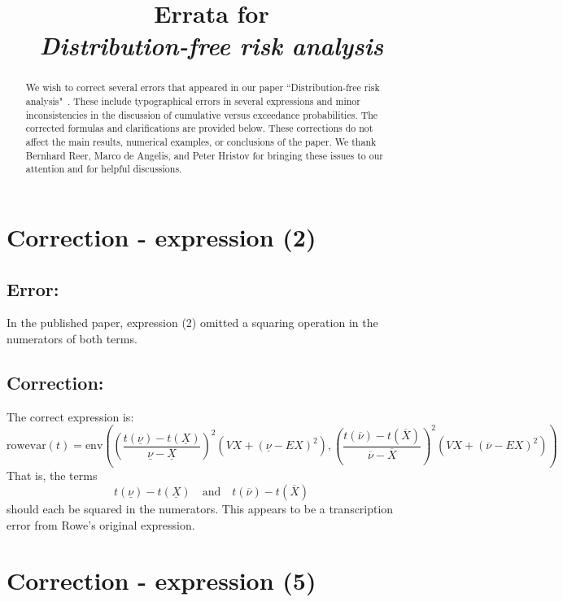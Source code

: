 \documentclass{article}
\title{Errata for \\ \textit{Distribution-free risk analysis}}
\begin{document}
\maketitle

\begin{abstract}
\noindent We wish to correct several errors that appeared in our paper ``Distribution-free risk analysis"~\cite{GRAY2022133}. These include typographical errors in several expressions and minor inconsistencies in the discussion of cumulative versus exceedance probabilities. The corrected formulas and clarifications are provided below. These corrections do not affect the main results, numerical examples, or conclusions of the paper. We thank Bernhard Reer, Marco de Angelis, and Peter Hristov for bringing these issues to our attention and for helpful discussions.
\end{abstract}

\section{Correction - expression (2)}
\subsection*{Error:}
In the published paper, expression (2) omitted a squaring operation in the numerators of both terms.

\subsection*{Correction:}
The correct expression is:
\begin{equation}
\text{rowevar}(t)
=
\text{env}\left(
\left(\frac{t\left(\underline{\nu}\right)-t\left(\underline{X}\right)}
{\underline{\nu}-\underline{X}}\right)^2
\left(VX+\left(\underline{\nu}-EX\right)^2\right),
\left(\frac{t\left(\overline{\nu}\right)-t\left(\overline{X}\right)}
{\overline{\nu}-\overline{X}}\right)^2
\left(VX+\left(\overline{\nu}-EX\right)^2\right)
\right)
\end{equation}
That is, the terms
\[
t\left(\underline{\nu}\right)-t\left(\underline{X}\right)
\quad\text{and}\quad
t\left(\overline{\nu}\right)-t\left(\overline{X}\right)
\]
should each be squared in the numerators. This appears to be a transcription error from Rowe's original expression.

\section{Correction - expression (5)}
\end{document}
